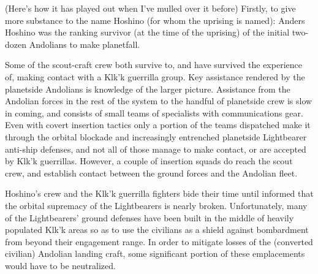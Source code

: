 \begin{itemize}
(Here's how it has played out when I've mulled over it before)
Firstly, to give more substance to the name Hoshino (for whom the
uprising is named): Anders Hoshino was the ranking survivor (at the
time of the uprising) of the initial two-dozen Andolians to make
planetfall.

Some of the scout-craft crew both survive to, and have survived the
experience of, making contact with a Klk'k guerrilla group. Key
assistance rendered by the planetside Andolians is knowledge of the
larger picture. Assistance from the Andolian forces in the rest of the
system to the handful of planetside crew is slow in coming, and
consists of small teams of specialists with communications gear. Even
with covert insertion tactics only a portion of the teams dispatched
make it through the orbital blockade and increasingly entrenched
planetside Lightbearer anti-ship defenses, and not all of those manage
to make contact, or are accepted by Klk'k guerrillas. However, a
couple of insertion squads do reach the scout crew, and establish
contact between the ground forces and the Andolian fleet.

Hoshino's crew and the Klk'k guerrilla fighters bide their time until
informed that the orbital supremacy of the Lightbearers is nearly
broken. Unfortunately, many of the Lightbearers' ground defenses have
been built in the middle of heavily populated Klk'k areas so as to
use the civilians as a shield against bombardment from beyond their
engagement range. In order to mitigate losses of the (converted
civilian) Andolian landing craft, some significant portion of these
emplacements would have to be neutralized.


\end{itemize}
